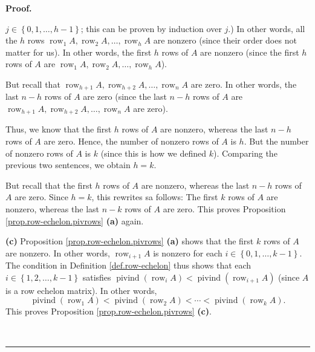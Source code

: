 \documentclass[numbers=enddot,12pt,final,onecolumn,notitlepage]{scrartcl}%
\theoremstyle{definition}
\newenvironment{proof}[1][Proof]{\noindent\textbf{#1.} }{\ \rule{0.5em}{0.5em}}
\begin{document}
\begin{proof}
{$j\in\left\{  0,1,\ldots,h-1\right\}  $; this can be proven by induction over
$j$.) In other words, all the $h$ rows $\operatorname*{row}\nolimits_{1}%
A,\operatorname*{row}\nolimits_{2}A,\ldots,\operatorname*{row}\nolimits_{h}A$
are nonzero (since their order does not matter for us). In other words, the
first $h$ rows of $A$ are nonzero (since the first $h$ rows of $A$ are
$\operatorname*{row}\nolimits_{1}A,\operatorname*{row}\nolimits_{2}%
A,\ldots,\operatorname*{row}\nolimits_{h}A$).
\par
But recall that $\operatorname*{row}\nolimits_{h+1}A,\operatorname*{row}%
\nolimits_{h+2}A,\ldots,\operatorname*{row}\nolimits_{n}A$ are zero. In other
words, the last $n-h$ rows of $A$ are zero (since the last $n-h$ rows of $A$
are $\operatorname*{row}\nolimits_{h+1}A,\operatorname*{row}\nolimits_{h+2}%
A,\ldots,\operatorname*{row}\nolimits_{n}A$ are zero).
\par
Thus, we know that the first $h$ rows of $A$ are nonzero, whereas the last
$n-h$ rows of $A$ are zero. Hence, the number of nonzero rows of $A$ is $h$.
But the number of nonzero rows of $A$ is $k$ (since this is how we defined
$k$). Comparing the previous two sentences, we obtain $h=k$.
\par
But recall that the first $h$ rows of $A$ are nonzero, whereas the last $n-h$
rows of $A$ are zero. Since $h=k$, this rewrites sa follows: The first $k$
rows of $A$ are nonzero, whereas the last $n-k$ rows of $A$ are zero. This
proves Proposition \ref{prop.row-echelon.pivrows} \textbf{(a)} again.}

\textbf{(c)} Proposition \ref{prop.row-echelon.pivrows} \textbf{(a)} shows
that the first $k$ rows of $A$ are nonzero. In other words,
$\operatorname*{row}\nolimits_{i+1}A$ is nonzero for each $i\in\left\{
0,1,\ldots,k-1\right\}  $. The condition in Definition \ref{def.row-echelon}
thus shows that each $i\in\left\{  1,2,\ldots,k-1\right\}  $ satisfies
$\operatorname*{pivind}\left(  \operatorname*{row}\nolimits_{i}A\right)
<\operatorname*{pivind}\left(  \operatorname*{row}\nolimits_{i+1}A\right)  $
(since $A$ is a row echelon matrix). In other words,%
\begin{equation}
\operatorname*{pivind}\left(  \operatorname*{row}\nolimits_{1}A\right)
<\operatorname*{pivind}\left(  \operatorname*{row}\nolimits_{2}A\right)
<\cdots<\operatorname*{pivind}\left(  \operatorname*{row}\nolimits_{k}%
A\right)  . \label{pf.prop.row-echelon.pivcells.ineq}%
\end{equation}
This proves Proposition \ref{prop.row-echelon.pivrows} \textbf{(c)}.


\end{proof}
\end{document}
